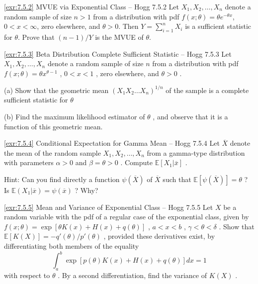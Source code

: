 \begin{exercise}{\ref{exr:7.5.2} MVUE via Exponential Class – Hogg 7.5.2}\label{exr:7.5.2}
Let $X_{1}, X_{2}, \ldots, X_{n}$ denote a random sample of size $n > 1$ from a distribution with pdf $f(x; \theta) = \theta e^{-\theta x}$, $0 < x < \infty$, zero elsewhere, and $\theta > 0$. Then $Y = \sum_{i=1}^{n} X_{i}$ is a sufficient statistic for $\theta$. Prove that $(n-1)/Y$ is the MVUE of $\theta$.
\end{exercise}

\begin{exercise}{\ref{exr:7.5.3} Beta Distribution Complete Sufficient Statistic – Hogg 7.5.3}\label{exr:7.5.3}
Let $X_1, X_2, \ldots, X_n$ denote a random sample of size $n$ from a distribution with pdf $f(x; \theta) = \theta x^{\theta - 1}$ , $0 < x < 1$ , zero elsewhere, and $\theta > 0$ .

(a) Show that the geometric mean $(X_{1}X_{2}\dots X_{n})^{1 / n}$ of the sample is a complete sufficient statistic for $\theta$

(b) Find the maximum likelihood estimator of $\theta$ , and observe that it is a function of this geometric mean.
\end{exercise}

\begin{exercise}{\ref{exr:7.5.4} Conditional Expectation for Gamma Mean – Hogg 7.5.4}\label{exr:7.5.4}
Let $\overline{X}$ denote the mean of the random sample $X_{1}, X_{2}, \ldots, X_{n}$ from a gamma-type distribution with parameters $\alpha > 0$ and $\beta = \theta > 0$ . Compute $\mathbb{E}[X_1|\overline{x}]$ .

Hint: Can you find directly a function $\psi(\overline{X})$ of $\overline{X}$ such that $\mathbb{E}[\psi(\overline{X})] = \theta$ ? Is $\mathbb{E}(X_1|\overline{x}) = \psi(\overline{x})$ ? Why?
\end{exercise}

\begin{exercise}{\ref{exr:7.5.5} Mean and Variance of Exponential Class – Hogg 7.5.5}\label{exr:7.5.5}
Let $X$ be a random variable with the pdf of a regular case of the exponential class, given by $f(x; \theta) = \exp[\theta K(x) + H(x) + q(\theta)]$ , $a < x < b$ , $\gamma < \theta < \delta$ . Show that $\mathbb{E}[K(X)] = -q'(\theta) / p'(\theta)$ , provided these derivatives exist, by differentiating both members of the equality
\[
\int_a^b \exp[p(\theta)K(x) + H(x) + q(\theta)] dx = 1
\]
with respect to $\theta$ . By a second differentiation, find the variance of $K(X)$ .
\end{exercise}

